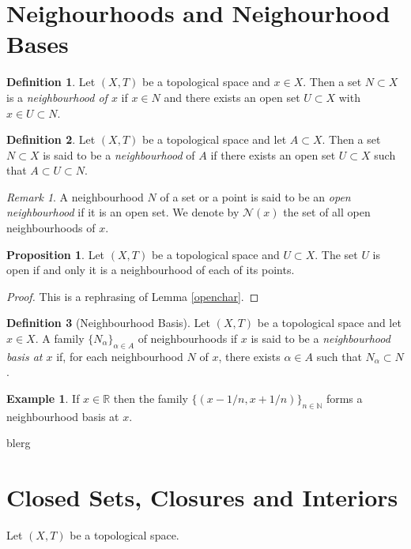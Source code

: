 \documentclass{book}
\theoremstyle{definition}
\newtheorem{proposition}{Proposition}[section]
\newtheorem{definition}{Definition}[section]
\newtheorem{example}{Example}[section]
\theoremstyle{remark}
\newtheorem{remark}{Remark}[section]
\newcommand{\R}{\mathbb{R}}
\newcommand{\N}{\mathbb{N}}
\newcommand{\neigh}[1]{\mathcal N(#1)}
\begin{document}
\section {Neighourhoods and Neighourhood Bases}
\begin{definition}
Let $(X,T)$ be a topological space and $x\in X$. Then a set $N\subset X$ is a \textit{neighbourhood of $x$} if $x\in N$ and there exists an open set $U\subset X$ with $x\in U\subset N$.
\end{definition}

\begin{definition}
Let $(X,T)$ be a topological space and let $A\subset X$. Then a set $N\subset X$ is said to be a \textit{neighbourhood} of $A$ if there exists an open set $U\subset X$ such that $A\subset U\subset N$.
\end{definition}

\begin{remark}
A neighbourhood $N$ of a set or a point is said to be an \textit{open neighbourhood} if it is an open set. We denote by $\neigh{x}$ the set of all open neighbourhoods of $x$.
\end{remark}

\begin{proposition}
Let $(X,T)$ be a topological space and $U\subset X$. The set $U$ is open if and only it is a neighbourhood of each of its points.
\end{proposition}
\begin{proof}
This is a rephrasing of Lemma \ref{openchar}.
\end{proof}

\begin{definition}[Neighbourhood Basis]
Let $(X,T)$ be a topological space and let $x\in X$. A family $\{N_\alpha\}_{\alpha\in A}$ of neighbourhoods if $x$ is said to be a \textit{neighbourhood basis at $x$} if, for each neighbourhood $N$ of $x$, there exists $\alpha\in A$ such that $N_\alpha\subset N$.
\end{definition}

\begin{example}
If $x\in\R$ then the family $\{(x-1/n,x+1/n)\}_{n\in\N}$ forms a neighbourhood basis at $x$.
\end{example}

blerg

\section{Closed Sets, Closures and Interiors}
Let $(X,T)$ be a topological space.
\end{document}
